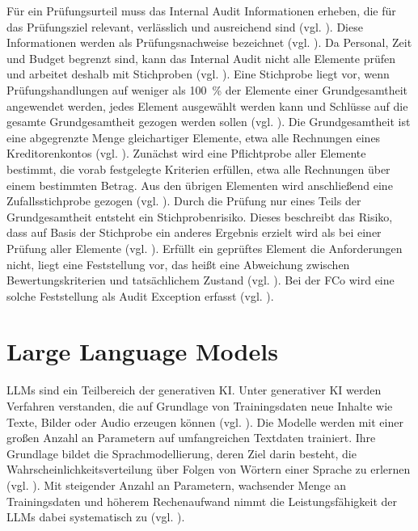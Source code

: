 Für ein Prüfungsurteil muss das Internal Audit Informationen erheben, die für das Prüfungsziel relevant, verlässlich und ausreichend sind (vgl. \cite[S.~104]{IIA2024}). Diese Informationen werden als Prüfungsnachweise bezeichnet (vgl. \cite[S.~5]{isa500}). Da Personal, Zeit und Budget begrenzt sind, kann das Internal Audit nicht alle Elemente prüfen und arbeitet deshalb mit Stichproben (vgl. \cite[S.~72]{vandernest2015sampling}). Eine Stichprobe liegt vor, wenn Prüfungshandlungen auf weniger als 100~\% der Elemente einer Grundgesamtheit angewendet werden, jedes Element ausgewählt werden kann und Schlüsse auf die gesamte Grundgesamtheit gezogen werden sollen (vgl. \cite[S.~12]{isa530}). Die Grundgesamtheit ist eine abgegrenzte Menge gleichartiger Elemente, etwa alle Rechnungen eines Kreditorenkontos (vgl. \cite[S.~12]{baumeister2019sample}). Zunächst wird eine Pflichtprobe aller Elemente bestimmt, die vorab festgelegte Kriterien erfüllen, etwa alle Rechnungen über einem bestimmten Betrag. Aus den übrigen Elementen wird anschließend eine Zufallsstichprobe gezogen (vgl. \cite{freudenberg2026auditsample}). Durch die Prüfung nur eines Teils der Grundgesamtheit entsteht ein Stichprobenrisiko. Dieses beschreibt das Risiko, dass auf Basis der Stichprobe ein anderes Ergebnis erzielt wird als bei einer Prüfung aller Elemente (vgl. \cite[S.~21]{isa530}). Erfüllt ein geprüftes Element die Anforderungen nicht, liegt eine Feststellung vor, das heißt eine Abweichung zwischen Bewertungskriterien und tatsächlichem Zustand (vgl. \cite[S.~11]{IIA2024}). Bei der \ac{FCo} wird eine solche Feststellung als Audit Exception erfasst (vgl. \cite{freudenberg2026auditsample}).

\section{Large Language Models}
\label{sec:llm}

\acp{LLM} sind ein Teilbereich der generativen \ac{KI}. Unter generativer \ac{KI} werden Verfahren verstanden, die auf Grundlage von Trainingsdaten neue Inhalte wie Texte, Bilder oder Audio erzeugen können (vgl. \cite[S.~111]{Feuerriegel2024GenerativeAI}). Die Modelle werden mit einer großen Anzahl an Parametern auf umfangreichen Textdaten trainiert. Ihre Grundlage bildet die Sprachmodellierung, deren Ziel darin besteht, die Wahrscheinlichkeitsverteilung über Folgen von Wörtern einer Sprache zu erlernen (vgl. \cite[S.~1]{zhao2023survey}). Mit steigender Anzahl an Parametern, wachsender Menge an Trainingsdaten und höherem Rechenaufwand nimmt die Leistungsfähigkeit der \acp{LLM} dabei systematisch zu (vgl. \cite[S.~3]{kaplan2020scaling}).

